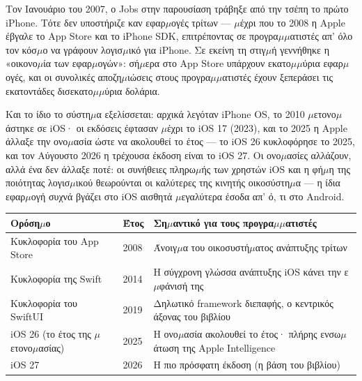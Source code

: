 


Τον Ιανουάριο του 2007, ο Jobs στην παρουσίαση τράβηξε από την τσέπη το πρώτο iPhone. Τότε δεν υποστήριζε καν εφαρ$\mu$ογές τρίτων — $\mu$έχρι που το 2008 η Apple έβγαλε το App Store και το iPhone SDK, επιτρέποντας σε προγρα$\mu$$\mu$ατιστές απ’ όλο τον κόσ$\mu$ο να γράφουν λογισ$\mu$ικό για iPhone. Σε εκείνη τη στιγ$\mu$ή γεννήθηκε η «οικονο$\mu$ία των εφαρ$\mu$ογών»: σή$\mu$ερα στο App Store υπάρχουν εκατο$\mu$$\mu$ύρια εφαρ$\mu$ογές, και οι συνολικές αποζη$\mu$ιώσεις στους προγρα$\mu$$\mu$ατιστές έχουν ξεπεράσει τις εκατοντάδες δισεκατο$\mu$$\mu$ύρια δολάρια.

Και το ίδιο το σύστη$\mu$α εξελίσσεται: αρχικά λεγόταν iPhone OS, το 2010 $\mu$ετονο$\mu$άστηκε σε iOS· οι εκδόσεις έφτασαν $\mu$έχρι το iOS 17 (2023), και το 2025 η Apple άλλαξε την ονο$\mu$ασία ώστε να ακολουθεί το έτος — το iOS 26 κυκλοφόρησε το 2025, και τον Αύγουστο 2026 η τρέχουσα έκδοση είναι το iOS 27. Οι ονο$\mu$ασίες αλλάζουν, αλλά ένα δεν άλλαξε ποτέ: οι συνήθειες πληρω$\mu$ής των χρηστών iOS και η φή$\mu$η της ποιότητας λογισ$\mu$ικού θεωρούνται οι καλύτερες της κινητής οικοσύστη$\mu$α — η ίδια εφαρ$\mu$ογή συχνά βγάζει στο iOS αισθητά $\mu$εγαλύτερα έσοδα απ’ ό, τι στο Android.

\begin{center}
\begin{tabularx}{\linewidth}{|X|X|X|}
\hline
\textbf{Ορόση$\mu$ο} & \textbf{Έτος} & \textbf{Ση$\mu$αντικό για τους προγρα$\mu$$\mu$ατιστές} \tabularnewline
\hline
Κυκλοφορία του App Store & 2008 & Άνοιγ$\mu$α του οικοσυστή$\mu$ατος ανάπτυξης τρίτων \tabularnewline
Κυκλοφορία της Swift & 2014 & Η σύγχρονη γλώσσα ανάπτυξης iOS κάνει την ε$\mu$φάνισή της \tabularnewline
Κυκλοφορία του SwiftUI & 2019 & Δηλωτικό framework διεπαφής, ο κεντρικός άξονας του βιβλίου \tabularnewline
iOS 26 (το έτος της $\mu$ετονο$\mu$ασίας) & 2025 & Η ονο$\mu$ασία ακολουθεί το έτος· πλήρης ενσω$\mu$άτωση της Apple Intelligence \tabularnewline
iOS 27 & 2026 & Η πιο πρόσφατη έκδοση (η βάση του βιβλίου) \tabularnewline
\hline
\end{tabularx}
\end{center}

